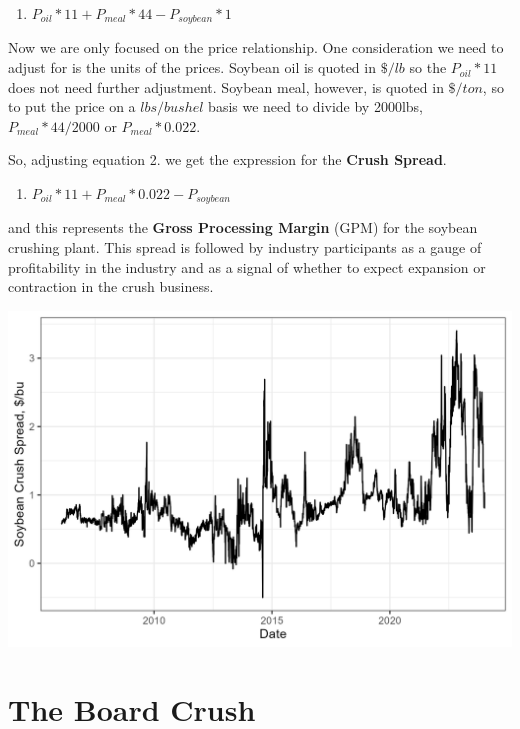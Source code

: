 \documentclass[
  letterpaper,
  DIV=11,
  numbers=noendperiod]{scrreprt}
\providecommand{\tightlist}{%
  \setlength{\itemsep}{0pt}\setlength{\parskip}{0pt}}\usepackage{longtable,booktabs,array}
\begin{document}
\begin{enumerate}
\def\labelenumi{\arabic{enumi}.}
\setcounter{enumi}{1}
\tightlist
\item
  \(P_{oil}*11 + P_{meal}*44 - P_{soybean}*1\)
\end{enumerate}

Now we are only focused on the price relationship. One consideration we
need to adjust for is the units of the prices. Soybean oil is quoted in
\(\$/lb\) so the \(P_{oil}*11\) does not need further adjustment.
Soybean meal, however, is quoted in \(\$/ton\), so to put the price on a
\(lbs/bushel\) basis we need to divide by 2000lbs, \(P_{meal}*44/2000\)
or \(P_{meal}*0.022\).

So, adjusting equation 2. we get the expression for the \textbf{Crush
Spread}.

\begin{enumerate}
\def\labelenumi{\arabic{enumi}.}
\setcounter{enumi}{2}
\tightlist
\item
  \(P_{oil}*11 + P_{meal}*0.022 - P_{soybean}\)
\end{enumerate}

and this represents the \textbf{Gross Processing Margin} (GPM) for the
soybean crushing plant. This spread is followed by industry participants
as a gauge of profitability in the industry and as a signal of whether
to expect expansion or contraction in the crush business.

\includegraphics{assets/SoyCrushSpread.png}

\hypertarget{the-board-crush}{%
\section{The Board Crush}\label{the-board-crush}}
\end{document}
